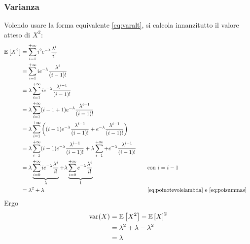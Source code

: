\subsubsection{Varianza}
Volendo usare la forma equivalente \eqref{eq:varalt}, si calcola innanzitutto il valore atteso di $X^2$:
\begin{align*}
	\mathbb{E}\left[ X^2 \right] & = \sum_{i=1}^{+\infty} i^2 e^{-\lambda}\frac{\lambda^i}{i!}                                                                                                                              \\
	         & = \sum_{i=1}^{+\infty} i e^{-\lambda} \frac{\lambda^i}{(i-1)!}                                                                                                                           \\
	         & = \lambda\sum_{i=1}^{+\infty} i e^{-\lambda}\frac{\lambda^{i-1}}{(i-1)!}                                                                                                                 \\
	         & = \lambda\sum_{i=1}^{+\infty} (i-1+1) e^{-\lambda}\frac{\lambda^{i-1}}{(i-1)!}                                                                                                           \\
	         & = \lambda\sum_{i=1}^{+\infty}\left((i-1)e^{-\lambda}\frac{\lambda^{i-1}}{(i-1)!}+e^{-\lambda}\frac{\lambda^{i-1}}{(i-1)!}\right)                                                         \\
	         & = \lambda\sum_{i=1}^{+\infty} (i-1)e^{-\lambda}\frac{\lambda^{i-1}}{(i-1)!} + \lambda\sum_{i=1}^{+\infty} + e^{-\lambda}\frac{\lambda^{i-1}}{(i-1)!}                                     \\
	         & = \lambda\underbrace{\sum_{i=0}^{+\infty} ie^{-\lambda}\frac{\lambda^i}{i!}}_{\lambda} + \lambda \underbrace{\sum_{i=0}^{+\infty} e^{-\lambda}\frac{\lambda^i}{i!}}_{1} & \quad & \text{con $i=i-1$} \\
	         & = \lambda^2 + \lambda & \quad & \text{\eqref{eq:poinotevolelambda} e \eqref{eq:poisummas}}
\end{align*}
Ergo
\begin{align}
	\operatorname{var}(X) & = \mathbb{E}\left[ X^2 \right] - \mathbb{E}\left[ X \right]^2         \nonumber \\
	        & = \lambda^2+\lambda-\lambda^2 \nonumber \\
	        & = \lambda
\end{align}

